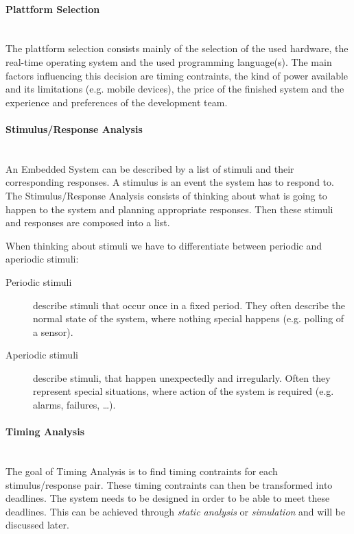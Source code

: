 \documentclass[10pt,a4paper,titlepage,draft]{scrartcl} %
\begin{document}
\paragraph{Plattform Selection} \ \\
The plattform selection consists mainly of the selection of the used hardware, the real-time operating system and the used programming language(s).
The main factors influencing this decision are timing contraints, the kind of power available and its limitations (e.g. mobile devices), the price of the finished system and the experience and preferences of the development team.

\paragraph{Stimulus/Response Analysis} \ \\
An Embedded System can be described by a list of stimuli and their corresponding responses.
A stimulus is an event the system has to respond to.
The Stimulus/Response Analysis consists of thinking about what is going to happen to the system and planning appropriate responses.
Then these stimuli and responses are composed into a list.

When thinking about stimuli we have to differentiate between periodic and aperiodic stimuli:
\begin{description}
	\item[Periodic stimuli] describe stimuli that occur once in a fixed period.
	They often describe the normal state of the system, where nothing special happens (e.g. polling of a sensor).
	\item[Aperiodic stimuli] describe stimuli, that happen unexpectedly and irregularly.
	Often they represent special situations, where action of the system is required (e.g. alarms, failures, \dots).
\end{description}

\paragraph{Timing Analysis} \ \\
The goal of Timing Analysis is to find timing contraints for each sti\-mu\-lus/re\-sponse pair.
These timing contraints can then be transformed into deadlines.
The system needs to be designed in order to be able to meet these deadlines.
This can be achieved through \emph{static analysis} or \emph{simulation} and will be discussed later.
\end{document}
